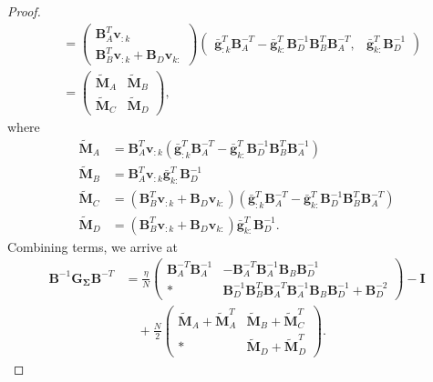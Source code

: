 \documentclass[a4paper, 11pt, oneside]{scrartcl}
\theoremstyle{break}
\newcommand{\matr}[1]{\boldsymbol{#1}}
\numberwithin{equation}{section}
\begin{document}
\begin{proof}
\begin{align*}
							&= \begin{pmatrix} \matr{B}_A^T \matr{v}_{:k} \\ \matr{B}_B^T \matr{v}_{:k} + \matr{B}_D \matr{v}_{k:} \end{pmatrix} \begin{pmatrix} \matr{\bar{g}}_{:k}^T \matr{B}_A^{-T} - \matr{\bar{g}}_{k:}^T \matr{B}_D^{-1} \matr{B}_B^T \matr{B}_A^{-T}, & \matr{\bar{g}}_{k:}^T \matr{B}_D^{-1} \end{pmatrix} \\
							&= \begin{pmatrix} \matr{\tilde{M}}_A & \matr{\tilde{M}}_B \\ \matr{\tilde{M}}_C & \matr{\tilde{M}}_D \end{pmatrix},
						\end{align*}
						where 
						\begin{align*}
							\matr{\tilde{M}}_A &= \matr{B}_A^T \matr{v}_{:k} (\matr{\bar{g}}_{:k}^T \matr{B}_A^{-T} - \matr{\bar{g}}_{k:}^T \matr{B}_D^{-1} \matr{B}_B^T \matr{B}_A^{-1}) \\
							\matr{\tilde{M}}_B &= \matr{B}_A^T \matr{v}_{:k} \matr{\bar{g}}_{k:}^T \matr{B}_D^{-1} \\
							\matr{\tilde{M}}_C &= (\matr{B}_B^T \matr{v}_{:k} + \matr{B}_D \matr{v}_{k:}) (\matr{\bar{g}}_{:k}^T \matr{B}_A^{-T} - \matr{\bar{g}}_{k:}^T \matr{B}_D^{-1} \matr{B}_B^T \matr{B}_A^{-T})\\
							\matr{\tilde{M}}_D &= (\matr{B}_B^T \matr{v}_{:k} + \matr{B}_D \matr{v}_{k:}) \matr{\bar{g}}_{k:}^T \matr{B}_D^{-1}.
						\end{align*}
						Combining terms, we arrive at
						\begin{align*}
							\matr{B}^{-1} \matr{G_{\Sigma}} \matr{B}^{-T} &= \frac{\eta}{N} \begin{pmatrix} \matr{B}_A^{-T} \matr{B}_A^{-1} & -\matr{B}_A^{-T} \matr{B}_A^{-1} \matr{B}_B \matr{B}_D^{-1} \\ * & \matr{B}_D^{-1} \matr{B}_B^T \matr{B}_A^{-T} \matr{B}_A^{-1} \matr{B}_B \matr{B}_D^{-1} + \matr{B}_D^{-2} \end{pmatrix} - \matr{I} \\
							&\quad + \frac{N}{2} \begin{pmatrix} \matr{\tilde{M}}_A + \matr{\tilde{M}}_A^T & \matr{\tilde{M}}_B + \matr{\tilde{M}}_C^T \\ * & \matr{\tilde{M}}_D + \matr{\tilde{M}}_D^T \end{pmatrix}.
						\end{align*}

\end{proof}
\end{document}
